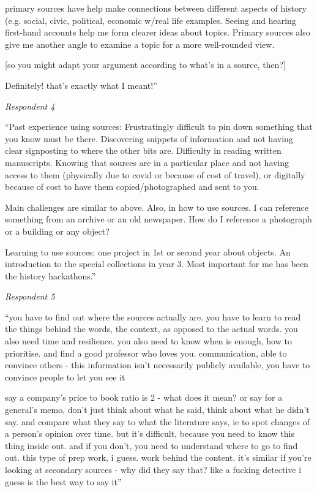\documentclass{l4proj}
\begin{document}
\begin{appendices}

primary sources have help make connections between different aspects of history (e.g. social, civic, political, economic w/real life examples.
Seeing and hearing first-hand accounts help me form clearer ideas about topics.
Primary sources also give me another angle to examine a topic for a more well-rounded view.

[so you might adapt your argument according to what’s in a source, then?]

Definitely! that’s exactly what I meant!”

\emph{Respondent 4}

“Past experience using sources: Frustratingly difficult to pin down something that you know must be there. Discovering snippets of information and not having clear signposting to where the other bits are. Difficulty in reading written manuscripts. Knowing that sources are in a particular place and not having access to them (physically due to covid or because of cost of travel), or digitally because of cost to have them copied/photographed and sent to you.

Main challenges are similar to above. Also, in how to use sources. I can reference something from an archive or an old newspaper. How do I reference a photograph or a building or any object?

Learning to use sources: one project in 1st or second year about objects. An introduction to the special collections in year 3. Most important for me has been the history hackathons.”

\emph{Respondent 5}

“you have to find out where the sources actually are. you have to learn to read the things behind the words, the context, as opposed to the actual words. you also need time and resilience. you also need to know when is enough, how to prioritise. and find a good professor who loves you. communication, able to convince others - this information isn’t necessarily publicly available, you have to convince people to let you see it

say a company’s price to book ratio is 2 - what does it mean? or say for a general’s memo, don’t just think about what he said, think about what he didn’t say. and compare what they say to what the literature says, ie to spot changes of a person’s opinion over time. but it’s difficult, because you need to know this thing inside out. and if you don’t, you need to understand where to go to find out. this type of prep work, i guess. work behind the content. it’s similar if you’re looking at secondary sources - why did they say that? like a fucking detective i guess is the best way to say it”


\end{appendices}
\end{document}
